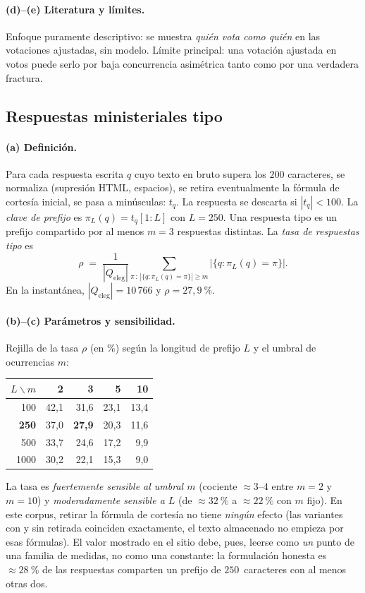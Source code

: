 \paragraph{(d)--(e) Literatura y límites.} Enfoque puramente descriptivo: se muestra
\emph{quién vota como quién} en las votaciones ajustadas, sin modelo. Límite
principal: una votación \og{}ajustada en votos\fg{} puede serlo por baja
concurrencia asimétrica tanto como por una verdadera fractura.

\subsection{Respuestas ministeriales \og{}tipo\fg{}}\label{sec:templates-es}

\paragraph{(a) Definición.} Para cada respuesta escrita $q$ cuyo texto en bruto
supera los $200$ caracteres, se normaliza (supresión HTML, espacios), se retira
eventualmente la fórmula de cortesía inicial, se pasa a minúsculas: $t_q$. La
respuesta se descarta si $|t_q|<100$. La \emph{clave de prefijo} es
$\pi_L(q)=t_q[1:L]$ con $L=250$. Una \og{}respuesta tipo\fg{} es un prefijo
compartido por al menos $m=3$ respuestas distintas. La \emph{tasa de respuestas
tipo} es
\[
\rho \;=\; \frac{1}{|Q_{\text{eleg}}|}\sum_{\pi \,:\, |\{q:\pi_L(q)=\pi\}|\ge m} \big|\{q:\pi_L(q)=\pi\}\big|.
\]
En la instantánea, $|Q_{\text{eleg}}|=10\,766$ y $\rho=27{,}9~\%$.

\paragraph{(b)--(c) Parámetros y sensibilidad.} Rejilla de la tasa $\rho$ (en \%)
según la longitud de prefijo $L$ y el umbral de ocurrencias $m$:
\begin{center}\small
\begin{tabular}{r|rrrr}
\toprule
$L\backslash m$ & 2 & \textbf{3} & 5 & 10 \\
\midrule
100  & 42,1 & 31,6 & 23,1 & 13,4 \\
\textbf{250}  & 37,0 & \textbf{27,9} & 20,3 & 11,6 \\
500  & 33,7 & 24,6 & 17,2 & \phantom{0}9,9 \\
1000 & 30,2 & 22,1 & 15,3 & \phantom{0}9,0 \\
\bottomrule
\end{tabular}
\end{center}
La tasa es \emph{fuertemente sensible al umbral $m$} (cociente $\approx 3$--$4$
entre $m=2$ y $m=10$) y \emph{moderadamente sensible a $L$} (de $\approx 32~\%$ a
$\approx 22~\%$ con $m$ fijo). En este corpus, retirar la fórmula de cortesía no
tiene \emph{ningún} efecto (las variantes \og{}con\fg{} y \og{}sin\fg{} retirada
coinciden exactamente, el texto almacenado no empieza por esas fórmulas). El valor
mostrado en el sitio debe, pues, leerse como \emph{un} punto de una familia de
medidas, no como una constante: la formulación honesta es \og{}$\approx 28~\%$ de
las respuestas comparten un prefijo de $250$~caracteres con al menos otras dos\fg{}.

